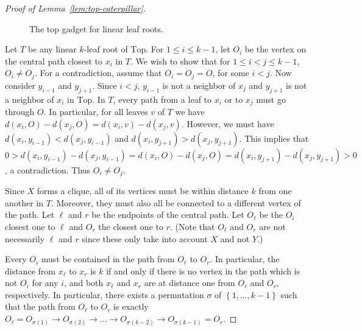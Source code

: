\documentclass[11pt,letter]{article}
\theoremstyle{remark}
\newcommand{\T}{\text{Top}}
\newcommand{\set}[1]{\left\{#1\right\}}
\begin{document}
\begin{proof}[Proof of Lemma~\ref{lem:top-caterpillar}]
\begin{figure}[h!]
        \caption{The top gadget for linear leaf roots.}\label{fig:linear-top}
    \end{figure}

    Let $T$ be any linear $k$-leaf root of $\T$.
    For $1\leq i\leq k-1$, let $O_i$ be the vertex on the central path closest to $x_i$ in $T$. We wish to show that 
for $1\leq i<j\leq k-1$, $O_i\neq O_j$. For a contradiction, assume that $O_i=O_j=O$, for some $i<j$. Now consider $y_{i-1}$ and $y_{j+1}$.  Since $i<j$, $y_{i-1}$ is not a neighbor of $x_j$ and $y_{j+1}$ is not a neighbor of $x_i$ in $\T$. In $T$, every path from a leaf to $x_i$ or to $x_j$ must go through $O$. In particular, for all leaves $v$ of $T$ we have $d(x_i,O)-d(x_j,O)=d(x_i,v)-d(x_j,v)$. However, we must have $d(x_i,y_{i-1})<d(x_j,y_{i-1})$ and $d(x_i,y_{j+1})>d(x_j,y_{j+1})$. This implies that $0>d(x_i,y_{i-1})-d(x_j,y_{i-1})=d(x_i,O)-d(x_j,O)=d(x_i,y_{j+1})-d(x_j,y_{j+1})>0$, a contradiction. Thus $O_i\neq O_j$.

    Since $X$ forms a clique, all of its vertices must be within distance $k$ from one another in $T$. Moreover, they must also all be connected to a different vertex of the path. Let $\ell$ and $r$ be the endpoints of the central path. Let $O_\ell$ be the $O_i$ closest one to $\ell$ and $O_r$ the closest one to $r$. (Note that $O_\ell$ and $O_r$ are not necessarily $\ell$ and $r$ since these only take into account $X$ and not $Y$.) 
    
    Every $O_i$ must be contained in the path from $O_\ell$ to $O_r$. In particular, the distance from $x_\ell$ to $x_r$ is $k$ if and only if there is no vertex in the path which is not $O_i$ for any $i$, and both $x_\ell$ and $x_r$ are at distance one from $O_\ell$ and $O_r$, respectively. In particular, there exists a permutation $\sigma$ of $\set{1,\dots,k-1}$ such that the path from $O_\ell$ to $O_r$ is exactly $O_\ell=O_{\sigma(1)}\rightarrow O_{\sigma(2)}\rightarrow \dots\rightarrow O_{\sigma(k-2)}\rightarrow O_{\sigma(k-1)}=O_r$.
    

\end{proof}
\end{document}
